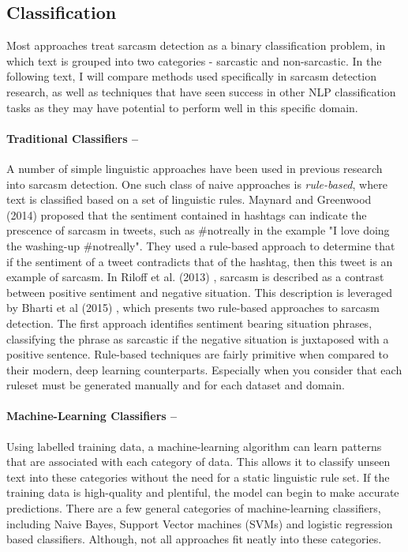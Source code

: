 \documentclass[12pt,a4paper]{article}
\begin{document}
\subsection{Classification}
\noindent Most approaches treat sarcasm detection as a binary classification problem, in which text is grouped into two categories - sarcastic and non-sarcastic. In the following text, I will compare methods used specifically in sarcasm detection research, as well as techniques that have seen success in other NLP classification tasks as they may have potential to perform well in this specific domain.

\paragraph{Traditional Classifiers --}
A number of simple linguistic approaches have been used in previous research into sarcasm detection. One such class of naive approaches is \textit{rule-based}, where text is classified based on a set of linguistic rules. Maynard and Greenwood (2014) \cite{maynard2014cares} proposed that the sentiment contained in hashtags can indicate the prescence of sarcasm in tweets, such as \#notreally in the example "I love doing the washing-up \#notreally". They used a rule-based approach to determine that if the sentiment of a tweet contradicts that of the hashtag, then this tweet is an example of sarcasm. In Riloff et al. (2013) \cite{riloff2013sarcasm}, sarcasm is described as a contrast between positive sentiment and negative situation. This description is leveraged by Bharti et al (2015) \cite{bharti2015parsing}, which presents two rule-based approaches to sarcasm detection. The first approach identifies sentiment bearing situation phrases, classifying the phrase as sarcastic if the negative situation is juxtaposed with a positive sentence. Rule-based techniques are fairly primitive when compared to their modern, deep learning counterparts. Especially when you consider that each ruleset must be generated manually and for each dataset and domain.


\paragraph{Machine-Learning Classifiers --}
Using labelled training data, a machine-learning algorithm can learn patterns that are associated with each category of data. This allows it to classify unseen text into these categories without the need for a static linguistic rule set. If the training data is high-quality and plentiful, the model can begin to make accurate predictions. There are a few general categories of machine-learning classifiers, including Naive Bayes, Support Vector machines (SVMs) and logistic regression based classifiers. Although, not all approaches fit neatly into these categories.
\end{document}
